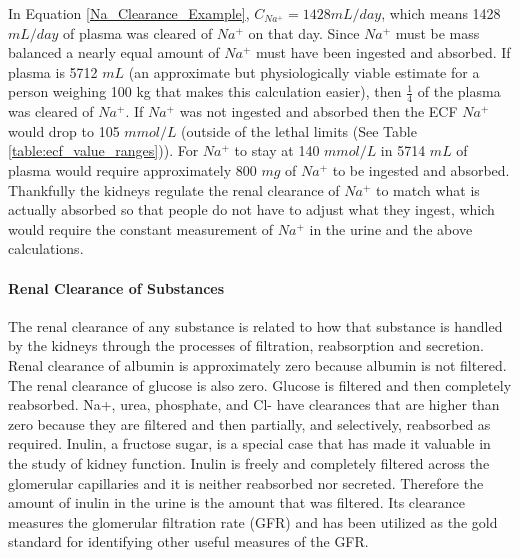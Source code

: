In Equation \ref{Na_Clearance_Example}, $C_{Na^+} = 1428 mL/day$, which means 1428 $mL/day$ of plasma was cleared of $Na^+$ on that day. Since $Na^+$ must be mass balanced a nearly equal amount of $Na^+$ must have been ingested and absorbed. If plasma is 5712 $mL$ (an approximate but physiologically viable estimate for a person weighing 100 kg that makes this calculation easier), then $\frac{1}{4}$ of the plasma was cleared of $Na^+$. If $Na^+$ was not ingested and absorbed then the ECF $Na^+$ would drop to 105 $mmol/L$ (outside of the lethal limits (See Table \ref{table:ecf_value_ranges})). For $Na^+$ to stay at 140 $mmol/L$ in 5714 $mL$ of plasma would require approximately 800 $mg$ of $Na^+$ to be ingested and absorbed.\footnotemark{}
Thankfully the kidneys regulate the renal clearance of $Na^+$ to match what is actually absorbed so that people do not have to adjust what they ingest, which would require the constant measurement of $Na^+$ in the urine and the above calculations.\footnotemark{}

\paragraph{Renal Clearance of Substances}

The renal clearance of any substance is related to how that substance is handled by the kidneys through the processes of filtration, reabsorption and secretion. Renal clearance of albumin is approximately zero because albumin is not filtered. The renal clearance of glucose is also zero. Glucose is filtered and then completely reabsorbed. Na+, urea, phosphate, and Cl- have clearances that are higher than zero because they are filtered and then partially, and selectively, reabsorbed as required. Inulin, a fructose sugar, is a special case that has made it valuable in the study of kidney function. Inulin is freely and completely filtered across the glomerular capillaries and it is neither reabsorbed nor secreted. Therefore the amount of inulin in the urine is the amount that was filtered. Its clearance measures the glomerular filtration rate (GFR) and has been utilized as the gold standard for identifying other useful measures of the GFR.

